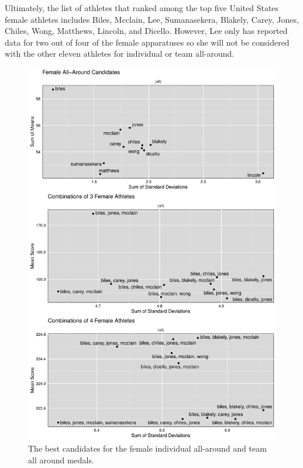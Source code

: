 \documentclass[12pt]{article}
\begin{document}
Ultimately, the list of athletes that ranked among the top five United States female athletes includes Biles, 
Mcclain, Lee, Sumanasekera, Blakely, Carey, Jones, Chiles, Wong, Matthews, Lincoln, and Dicello. However, Lee 
only has reported data for two out of four of the female apparatuses so she will not be considered with the other 
eleven athletes for individual or team all-around.

\begin{figure}
  \centering
  \includegraphics[scale=0.55]{FinalFemaleAllAroundPlot.pdf}
  \caption{The best candidates for the female individual all-around and team all around medals.}
  \label{fig:FAA}
\end{figure}
\end{document}
